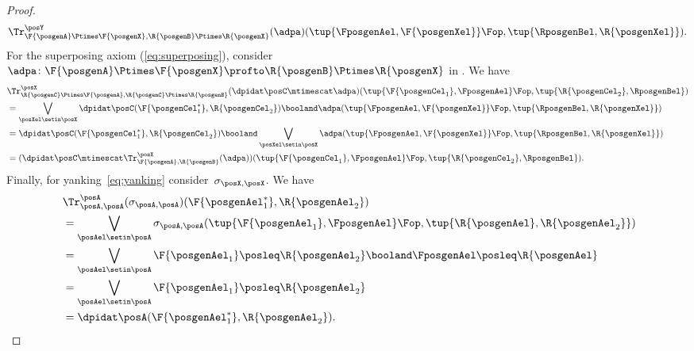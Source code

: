 {\begin{proof}
\begin{equation}
\begin{aligned}
{                    \Tr_{\F{\posgenA}\Ptimes \F{\posgenX},\R{\posgenB}\Ptimes \R{\posgenX}}^\posY(\adpa)(\tup{\FposgenAel,\F{\posgenXel}}\Fop, \tup{\RposgenBel,\R{\posgenXel}})}.
            \end{aligned}
        \end{equation}
        For the superposing axiom (\cref{eq:superposing}), consider~$\adpa\colon \F{\posgenA}\Ptimes \F{\posgenX}\profto \R{\posgenB}\Ptimes \R{\posgenX}$ in \DP.
        We have
        \begin{equation}
            \begin{aligned}
                {}
                 & \Tr_{\R{\posgenC}\Ptimes \F{\posgenA},\R{\posgenC}\Ptimes \R{\posgenB}}^{\posX}(\dpidat\posC\mtimescat \adpa)(\tup{\F{\posgenCel_1},\FposgenAel}\Fop, \tup{\R{\posgenCel_2},\RposgenBel}) \\
                 & = \bigvee_{\posXel \setin \posX} \dpidat\posC(\F{\posgenCel_1^*},\R{\posgenCel_2})\booland \adpa(\tup{\FposgenAel,\F{\posgenXel}}\Fop, \tup{\RposgenBel,\R{\posgenXel}}) \\
                 & =\dpidat\posC(\F{\posgenCel_1^*},\R{\posgenCel_2}) \booland \bigvee_{\posXel\setin \posX} \adpa(\tup{\FposgenAel,\F{\posgenXel}}\Fop, \tup{\RposgenBel,\R{\posgenXel}}) \\
                 & =(\dpidat\posC \mtimescat \Tr_{\F{\posgenA},\R{\posgenB}}^\posX(\adpa))(\tup{\F{\posgenCel_1},\FposgenAel}\Fop, \tup{\R{\posgenCel_2},\RposgenBel}).
            \end{aligned}
        \end{equation}
        Finally, for yanking~\cref{eq:yanking} consider~$\sigma_{\posX,\posX}$.
        We have
        \begin{equation}
            \begin{aligned}
                ~ & \Tr_{\posA,\posA}^{\posA}(\sigma_{\posA,\posA})(\F{\posgenAel_1^*},\R{\posgenAel_2}) \\
                  & = \bigvee_{\posAel\setin \posA} \sigma_{\posA,\posA}(\tup{\F{\posgenAel_1},\FposgenAel}\Fop, \tup{\R{\posgenAel},\R{\posgenAel_2}}) \\
                  & =\bigvee_{\posAel\setin \posA} \F{\posgenAel_1} \posleq \R{\posgenAel_2} \booland \FposgenAel\posleq \R{\posgenAel} \\
                  & =\bigvee_{\posAel\setin \posA} \F{\posgenAel_1} \posleq \R{\posgenAel_2} \\
                  & =\dpidat\posA(\F{\posgenAel_1^*},\R{\posgenAel_2}).
            \end{aligned}
        \end{equation}
    \end{proof}
}

